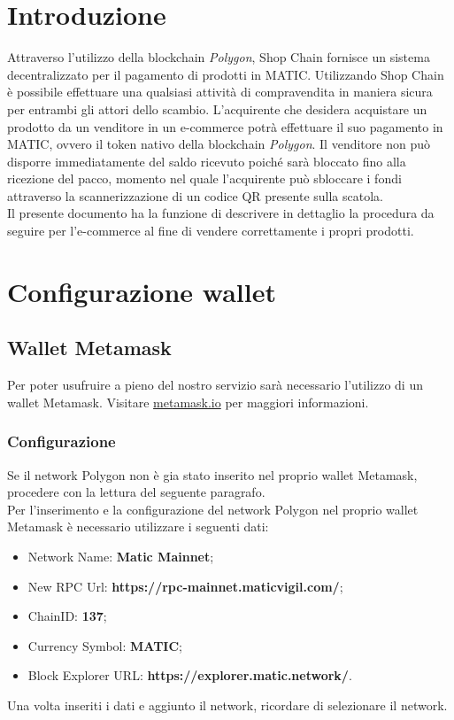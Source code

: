 \documentclass[a4paper, 12pt]{article}
\begin{document}
\makefrontpage
\makeversioni
\tableofcontents
\newpage

\section{Introduzione}
Attraverso l'utilizzo della blockchain \textit{Polygon}, Shop Chain fornisce un sistema decentralizzato per il pagamento di prodotti in MATIC. Utilizzando Shop Chain è possibile effettuare una qualsiasi attività di compravendita in maniera sicura per entrambi gli attori dello scambio. L'acquirente che desidera acquistare un prodotto da un venditore in un e-commerce potrà effettuare il suo pagamento in MATIC, ovvero il token nativo della blockchain \textit{Polygon}. Il venditore non può disporre immediatamente del saldo ricevuto poiché sarà bloccato fino alla ricezione del pacco, momento nel quale l'acquirente può sbloccare i fondi attraverso la scannerizzazione di un codice QR presente sulla scatola.
\\Il presente documento ha la funzione di descrivere in dettaglio la procedura da seguire per l'e-commerce al fine di vendere correttamente i propri prodotti.

\section{Configurazione wallet}
\subsection{Wallet Metamask}
Per poter usufruire a pieno del nostro servizio sarà necessario l'utilizzo di un wallet Metamask. Visitare \href{https://www.metamask.io}{metamask.io} per maggiori informazioni.
\subsubsection{Configurazione}
Se il network Polygon non è gia stato inserito nel proprio wallet Metamask, procedere con la lettura del seguente paragrafo.
\\Per l'inserimento e la configurazione del network Polygon nel proprio wallet Metamask è necessario utilizzare i seguenti dati:
\begin{itemize}
\item Network Name: \textbf{Matic Mainnet};
\item New RPC Url: \textbf{https://rpc-mainnet.maticvigil.com/};
\item ChainID: \textbf{137};
\item Currency Symbol: \textbf{MATIC};
\item Block Explorer URL: \textbf{https://explorer.matic.network/}.
\end{itemize}
Una volta inseriti i dati e aggiunto il network, ricordare di selezionare il network.
\end{document}
